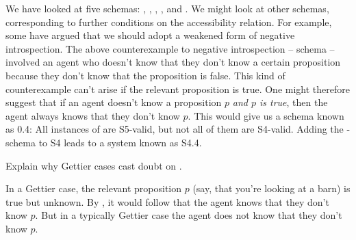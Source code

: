 

We have looked at five schemas: , , , , and .
We might look at other schemas, corresponding to further conditions on the
accessibility relation. For example, some have argued that we should adopt a
weakened form of negative introspection. The above counterexample to negative
introspection -- schema  -- involved an agent who doesn't know that they
don't know a certain proposition because they don't know that the proposition is
false. This kind of counterexample can't arise if the relevant proposition is
true. One might therefore suggest that if an agent doesn't know a proposition
$p$ \emph{and $p$ is true}, then the agent always knows that they don't know
$p$. This would give us a schema known as 0.4:
%
%
All instances of  are S5-valid, but not all of them are S4-valid. Adding
the -schema to S4 leads to a system known as S4.4.


\begin{exercise}
  Explain why Gettier cases cast doubt on .
\end{exercise}
\begin{solution}
  In a Gettier case, the relevant proposition $p$ (say, that you're looking at a
  barn) is true but unknown. By , it would follow that the agent knows
  that they don't know $p$. But in a typically Gettier case the agent does not
  know that they don't know $p$.
\end{solution}


